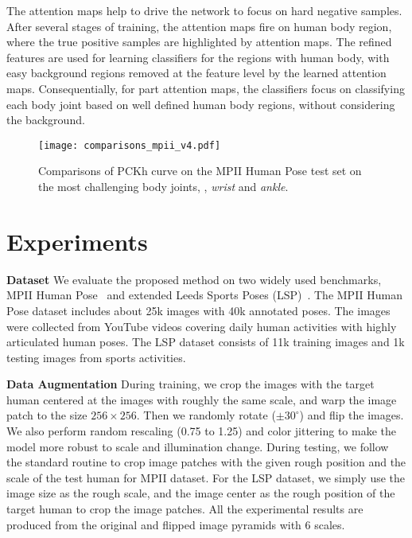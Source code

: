 \documentclass[10pt,twocolumn,letterpaper]{article}
\newcommand{\smalltitle}[1]{\vspace{0.2em}\noindent \textbf{{#1}}}
\begin{document}
The attention maps help to drive the network to focus on hard negative samples. 
After several stages of training, the attention maps fire on human body region, where the true positive samples are highlighted by attention maps. The refined  features are used for learning classifiers for the regions with human body, with easy background regions removed at the feature level by the learned attention maps. 
Consequentially, for part attention maps, the classifiers focus on classifying each body joint based on well defined human body regions, without considering the background.





\begin{figure}[t]
\begin{center}
  \texttt{[image: comparisons\_mpii\_v4.pdf]}
\end{center}
\vspace{-1.2em}
   \caption{\small Comparisons of PCKh curve on the MPII Human Pose test set on the most challenging body joints, \ie, \textit{wrist} and \textit{ankle}. }
   \vspace{-1.1em}
\label{fig:comparisons_mpii}
\end{figure}




\section{Experiments}


\smalltitle{Dataset}
We evaluate the proposed method on two widely used benchmarks, MPII Human Pose~\cite{andriluka20142d} and extended Leeds Sports Poses  (LSP)~\cite{johnson2010clustered}. The MPII Human Pose dataset includes about 25k images with 40k annotated poses. The images were collected from YouTube videos covering daily human activities with highly articulated human poses. The LSP dataset consists of 11k training images and 1k testing images from sports activities. 

\smalltitle{Data Augmentation} During training, we crop the images with the target human centered at the images with roughly the same scale, and warp the image patch to the size $256\times 256$. Then we randomly rotate ($\pm 30^{\circ}$) and flip the images. We also perform random rescaling (0.75 to 1.25) and color jittering to make the model more robust to scale and illumination change. During testing, we follow the standard routine to crop image patches with the given rough position and the scale of the test human for MPII dataset. For the LSP dataset, we simply use the image size as the rough scale, and the image center as the rough position of the target human to crop the image patches. All the experimental results are produced from the original and flipped image pyramids with 6 scales.
\end{document}
